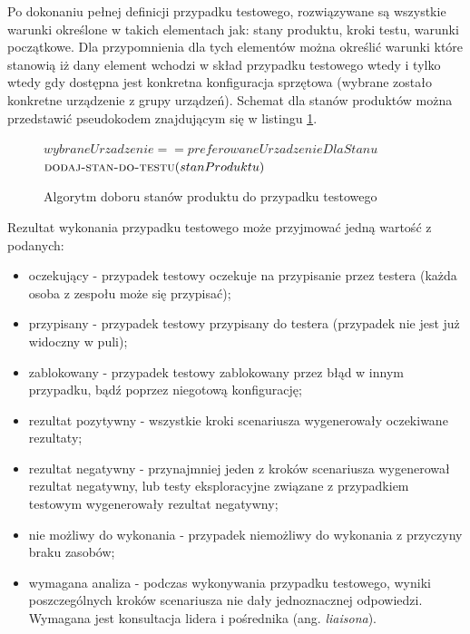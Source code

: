 Po dokonaniu pełnej definicji przypadku testowego, rozwiązywane są wszystkie warunki określone w takich elementach jak: stany produktu, kroki testu, warunki początkowe. Dla przypomnienia dla tych elementów można określić warunki które stanowią iż dany element wchodzi w skład przypadku testowego wtedy i tylko wtedy gdy dostępna jest konkretna konfiguracja sprzętowa (wybrane zostało konkretne urządzenie z grupy urządzeń). Schemat dla stanów produktów można przedstawić pseudokodem znajdującym się w listingu \ref{lst:doborWarunkow}.
\begin{figure}[h]
	\begin{codebox}
	\li {}
	\li \Do   
	\li \Do
	     \If $wybraneUrzadzenie  ==  preferowaneUrzadzenieDlaStanu$
	\li     \Then
	           $\textnormal{\scshape dodaj-stan-do-testu}(stanProduktu)$	         	         
	        \End	        
	\li  \End	 
	\li
	  \End
	  
	\end{codebox}
	\caption{ Algorytm doboru stanów produktu do przypadku testowego }
	\label{lst:doborWarunkow}
\end{figure}
\newpage

Rezultat wykonania przypadku testowego może przyjmować jedną wartość z podanych:
\begin{itemize}
   \item oczekujący - przypadek testowy oczekuje na przypisanie przez testera (każda osoba z zespołu może się przypisać);
   \item przypisany - przypadek testowy przypisany do testera (przypadek nie jest już widoczny w puli);
   \item zablokowany - przypadek testowy zablokowany przez błąd w innym przypadku, bądź poprzez niegotową konfigurację;
   \item rezultat pozytywny - wszystkie kroki scenariusza wygenerowały oczekiwane rezultaty;
   \item rezultat negatywny - przynajmniej jeden z kroków scenariusza wygenerował rezultat negatywny, lub testy eksploracyjne związane z przypadkiem testowym wygenerowały rezultat negatywny;
   \item nie możliwy do wykonania - przypadek niemożliwy do wykonania z przyczyny braku zasobów;
   \item wymagana analiza - podczas wykonywania przypadku testowego, wyniki poszczególnych kroków scenariusza nie dały jednoznacznej odpowiedzi. Wymagana jest konsultacja lidera i pośrednika (ang. \textit{liaisona}).
 \end{itemize} 

